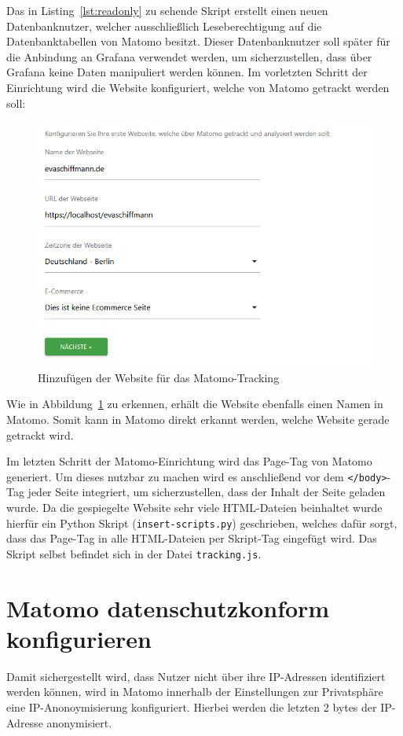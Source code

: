 Das in Listing~\ref{lst:readonly} zu sehende Skript erstellt einen neuen Datenbanknutzer, welcher ausschließlich Leseberechtigung auf die Datenbanktabellen von Matomo besitzt. Dieser Datenbanknutzer soll später für die Anbindung an Grafana verwendet werden, um sicherzustellen, dass über Grafana keine Daten manipuliert werden können. Im vorletzten Schritt der Einrichtung wird die Website konfiguriert, welche von Matomo getrackt werden soll: 

\begin{figure}[H]
    \centering
    \includegraphics[width=\textwidth, keepaspectratio]{images/website-hinzufuegen.png}
    \caption{Hinzufügen der Website für das Matomo-Tracking}
    \label{fig:website-hinzufuegen}
\end{figure}

Wie in Abbildung~\ref{fig:website-hinzufuegen} zu erkennen, erhält die Website ebenfalls einen Namen in Matomo. Somit kann in Matomo direkt erkannt werden, welche Website gerade getrackt wird. 

Im letzten Schritt der Matomo-Einrichtung wird das Page-Tag von Matomo generiert. Um dieses nutzbar zu machen wird es anschließend vor dem \texttt{</body>}-Tag jeder Seite integriert, um sicherzustellen, dass der Inhalt der Seite geladen wurde. Da die gespiegelte Website sehr viele HTML-Dateien beinhaltet wurde hierfür ein Python Skript (\texttt{insert\allowbreak-scripts.py}) geschrieben, welches dafür sorgt, dass das Page-Tag in alle HTML-Dateien per Skript-Tag eingefügt wird. Das Skript selbst befindet sich in der Datei \texttt{tracking.js}. 


\section{Matomo datenschutzkonform konfigurieren}
Damit sichergestellt wird, dass Nutzer nicht über ihre IP-Adressen identifiziert werden können, wird in Matomo innerhalb der Einstellungen zur Privatsphäre eine IP-Anonoymisierung konfiguriert. Hierbei werden die letzten 2 bytes der IP-Adresse anonymisiert. 

